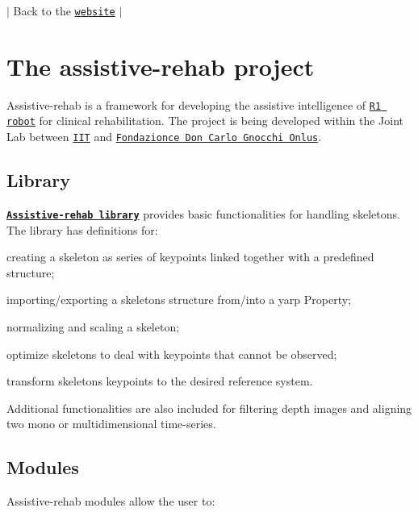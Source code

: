 $\vert$ Back to the \href{https://robotology.github.io/assistive-rehab/doc/mkdocs/site/index.html}{\tt website} $\vert$

\section*{The assistive-\/rehab project}

Assistive-\/rehab is a framework for developing the assistive intelligence of \href{https://www.youtube.com/watch?v=TBphNGW6m4o}{\tt R1 robot} for clinical rehabilitation. The project is being developed within the Joint Lab between \href{https://www.iit.it}{\tt I\+IT} and \href{https://www.dongnocchi.it}{\tt Fondazionce Don Carlo Gnocchi Onlus}.

\subsection*{Library}

\href{https://robotology.github.io/assistive-rehab/doc/doxygen/doc/html/group__skeleton.html}{\tt {\bfseries {\ttfamily Assistive-\/rehab library}}} provides basic functionalities for handling skeletons. The library has definitions for\+:


\begin{DoxyItemize}
\item creating a skeleton as series of keypoints linked together with a predefined structure;
\item importing/exporting a skeleton\textquotesingle{}s structure from/into a yarp Property;
\item normalizing and scaling a skeleton;
\item optimize skeletons to deal with keypoints that cannot be observed;
\item transform skeleton\textquotesingle{}s keypoints to the desired reference system.
\end{DoxyItemize}

Additional functionalities are also included for filtering depth images and aligning two mono or multidimensional time-\/series.

\subsection*{Modules}

Assistive-\/rehab modules allow the user to\+:


